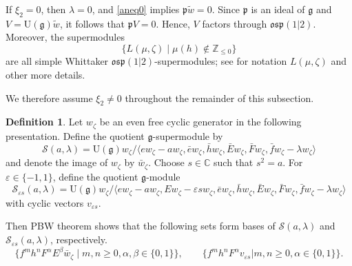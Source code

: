 \documentclass[a4paper,10pt]{article}
\theoremstyle{definition}
\newtheorem{definition}{Definition}[section]
\theoremstyle{plain}
\theoremstyle{remark}
\theoremstyle{mystyle}
\numberwithin{equation}{section}
\begin{document}
If \(\xi_2=0\), then \(\lambda=0\), and \eqref{aneq0} implies $\mathfrak p\widetilde w=0$. Since \(\mathfrak p\) is an ideal of \(\mathfrak g\) and \(V=\mathrm U(\mathfrak g)\widetilde w\), it follows that \(\mathfrak pV=0\). Hence, \(V\) factors through \(\mathfrak{osp}(1|2)\). Moreover, the supermodules
\[
\{L(\mu,\zeta)\mid \mu(h)\notin\mathbb Z_{\leqslant 0}\}
\]
are all simple Whittaker \(\mathfrak{osp}(1|2)\)-supermodules; see \cite[Corollary 19]{CCh24a} for notation $L(\mu,\zeta)$ and other more details.

We therefore assume $\xi_2\neq 0$ throughout the remainder of this subsection.

\begin{definition}
    Let $w_{\zeta}$ be an even free cyclic generator in the following presentation. Define the quotient $\mathfrak g$-supermodule  by
    $$
    \mathcal {S}(a,\lambda)=\mathrm U(\mathfrak g)w_{\zeta}/\langle ew_{\zeta}-aw_{\zeta},\bar ew_{\zeta},\bar hw_{\zeta},\bar Ew_{\zeta},\bar Fw_{\zeta},\bar fw_{\zeta}-\lambda w_{\zeta}\rangle
    $$ 
    and denote the image of $w_{\zeta}$ by $\bar w_{\zeta}$. Choose $s\in \mathbb C$ such that $s^2=a$. For $\varepsilon\in \{-1,1\}$, define the quotient $\mathfrak g$-module 
    $$
    \mathcal {S}_{\varepsilon s}(a,\lambda)=\mathrm U(\mathfrak g)w_{\zeta}/\langle ew_{\zeta}-aw_{\zeta},Ew_{\zeta}-\varepsilon sw_{\zeta},\bar ew_{\zeta},\bar hw_{\zeta},\bar Ew_{\zeta},\bar Fw_{\zeta},\bar fw_{\zeta}-\lambda w_{\zeta}\rangle
    $$
    with cyclic vectors $v_{\varepsilon s}$. 
\end{definition}
    Then PBW theorem shows that the following sets form bases of $\mathcal {S}(a,\lambda)$ and $\mathcal {S}_{\varepsilon s}(a,\lambda)$, respectively.
    $$
    \{f^mh^nF^{\alpha}E^{\beta}\bar w_{\zeta}\mid m,n\geq 0,\alpha,\beta  \in \{0,1\}\},\qquad \{f^mh^nF^{\alpha}v_{\varepsilon s}|m,n\geq 0,\alpha  \in \{0,1\}\}.
    $$ 
\end{document}
